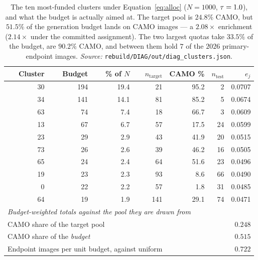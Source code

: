 \begin{table}[h]
\caption{The ten most-funded clusters under Equation~\ref{eq:alloc} ($N = 1000$, $\tau = 1.0$), and what the budget is actually aimed at. The target pool is $24.8\%$ CAMO, but $51.5\%$ of the generation budget lands on CAMO images --- a $2.08\times$ enrichment ($2.14\times$ under the committed assignment). The two largest quotas take $33.5\%$ of the budget, are $90.2\%$ CAMO, and between them hold $7$ of the $2026$ primary-endpoint images. \emph{Source:} \texttt{rebuild/DIAG/out/diag\_clusters.json}.}
\label{tab:clustercomp}
\begin{center}
\small
\begin{tabular}{rrrrrrr}
\toprule
Cluster & Budget & \% of $N$ & $n_{\text{target}}$ & CAMO \% & $n_{\text{test}}$ & $e_j$ \\
\midrule
30 & 194 & 19.4 & 21 & 95.2 & 2 & 0.0707 \\
34 & 141 & 14.1 & 81 & 85.2 & 5 & 0.0674 \\
63 & 74 & 7.4 & 18 & 66.7 & 3 & 0.0609 \\
13 & 67 & 6.7 & 57 & 17.5 & 24 & 0.0599 \\
23 & 29 & 2.9 & 43 & 41.9 & 20 & 0.0515 \\
73 & 26 & 2.6 & 39 & 46.2 & 16 & 0.0505 \\
65 & 24 & 2.4 & 64 & 51.6 & 23 & 0.0496 \\
19 & 23 & 2.3 & 93 & 8.6 & 66 & 0.0490 \\
0 & 22 & 2.2 & 57 & 1.8 & 31 & 0.0485 \\
64 & 19 & 1.9 & 141 & 29.1 & 74 & 0.0471 \\
\midrule
\multicolumn{7}{l}{\emph{Budget-weighted totals against the pool they are drawn from}} \\
\multicolumn{4}{l}{CAMO share of the target pool} & \multicolumn{3}{r}{$0.248$} \\
\multicolumn{4}{l}{CAMO share of the \emph{budget}} & \multicolumn{3}{r}{$\mathbf{0.515}$} \\
\multicolumn{4}{l}{Endpoint images per unit budget, against uniform} & \multicolumn{3}{r}{$0.722$} \\
\bottomrule
\end{tabular}
\end{center}
\end{table}
